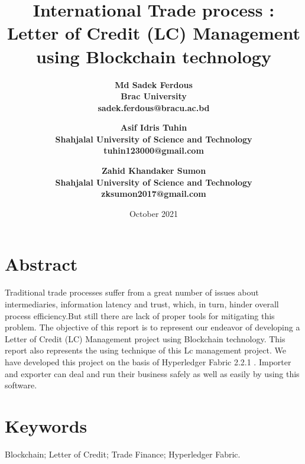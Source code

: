 \documentclass[a4paper,12pt]{report}
\title{\textbf{International Trade process : Letter of Credit (LC) Management using Blockchain technology}}
\author{
\bf Md Sadek Ferdous\\
Brac University\\
sadek.ferdous@bracu.ac.bd\\
\and
\bf Asif Idris Tuhin\\
Shahjalal University of Science and Technology\\
tuhin123000@gmail.com\\
\and
\bf Zahid Khandaker Sumon\\
Shahjalal University of Science and Technology\\
zksumon2017@gmail.com\\
}
\date{October 2021}
\begin{document}
\maketitle


\section*{Abstract}
Traditional trade processes suffer from a great number of issues about intermediaries, information latency and trust, which, in turn, hinder overall process efficiency.But still there are lack of proper tools for mitigating this problem. The objective of this report is to represent our endeavor of developing a Letter of Credit (LC) Management project using Blockchain technology. This report also represents the using technique of this Lc management project. We have developed this project on the basis of Hyperledger Fabric 2.2.1 . Importer and exporter can deal and run their business safely as well as easily by using this software.


\vspace{100pt}
\section*{Keywords}
Blockchain; Letter of Credit; Trade Finance; Hyperledger Fabric.

\newpage




\tableofcontents



\vspace{100pt}
\end{document}
